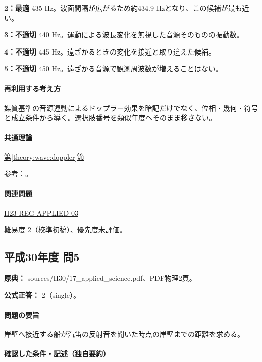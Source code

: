 \noindent\textbf{2：最適} 435 Hz。波面間隔が広がるため約434.9 Hzとなり、この候補が最も近い。\par

\noindent\textbf{3：不適切} 440 Hz。運動による波長変化を無視した音源そのものの振動数。\par

\noindent\textbf{4：不適切} 445 Hz。遠ざかるときの変化を接近と取り違えた候補。\par

\noindent\textbf{5：不適切} 450 Hz。遠ざかる音源で観測周波数が増えることはない。\par

\paragraph{再利用する考え方} 媒質基準の音源運動によるドップラー効果を暗記だけでなく、位相・幾何・符号と成立条件から導く。選択肢番号を類似年度へそのまま移さない。

\paragraph{共通理論} \hyperref[theory:wave:doppler]{第\ref*{theory:wave:doppler}節}

\par 参考：\cite{os_doppler}。

\paragraph{関連問題} \hyperref[q:h23-reg-applied-03]{H23-REG-APPLIED-03}

\par 難易度 2（校準初稿）、優先度未評価。

\subsection{平成30年度 問5}
\label{q:h30-reg-applied-05}

\noindent\textbf{原典：} sources/H30/17\_applied\_science.pdf、PDF物理2頁。

\textbf{公式正答：} 2（single）。

\paragraph{問題の要旨} 岸壁へ接近する船が汽笛の反射音を聞いた時点の岸壁までの距離を求める。

\paragraph{確認した条件・記述（独自要約）}\mbox{}\par


